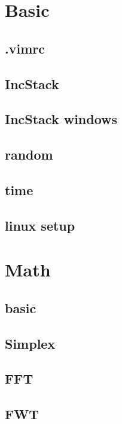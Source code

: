 \section{Basic}
\subsection{.vimrc}

\subsection{IncStack}

\subsection{IncStack windows}

\subsection{random}

\subsection{time}

\subsection{linux setup}


\section{Math}
\subsection{basic}

\subsection{Simplex}

\subsection{FFT}

\subsection{FWT}

%
